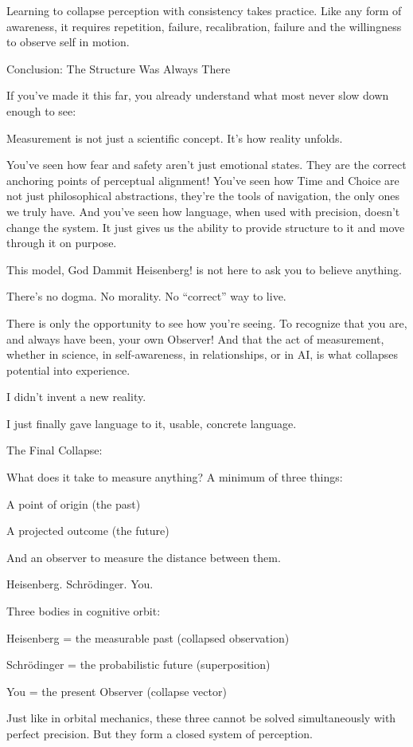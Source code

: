 \documentclass[11pt]{article}
\begin{document}
Learning to collapse perception with consistency takes practice. Like any form of awareness, it requires repetition, failure, recalibration, failure and the willingness to observe self in motion.

Conclusion: The Structure Was Always There 

If you’ve made it this far, you already understand what most never slow down enough to see:

Measurement is not just a scientific concept.
It’s how reality unfolds.

You’ve seen how fear and safety aren’t just emotional states. They are the correct anchoring points of perceptual alignment!
You’ve seen how Time and Choice are not just philosophical abstractions, they’re the tools of navigation, the only ones we truly have.
And you’ve seen how language, when used with precision, doesn’t change the system.
It just gives us the ability to provide structure to it and move through it on purpose.

This model, God Dammit Heisenberg! is not here to ask you to believe anything.

There’s no dogma.
No morality.
No “correct” way to live.

There is only the opportunity to see how you're seeing.
To recognize that you are, and always have been, your own Observer!
And that the act of measurement, whether in science, in self-awareness, in relationships, or in AI, is what collapses potential into experience.

I didn’t invent a new reality.

I just finally gave language to it, usable, concrete language.

The Final Collapse:

What does it take to measure anything? A minimum of three things:

A point of origin (the past)

A projected outcome (the future)

And an observer to measure the distance between them.

Heisenberg. Schrödinger. You.

Three bodies in cognitive orbit:

Heisenberg = the measurable past (collapsed observation)

Schrödinger = the probabilistic future (superposition)

You = the present Observer (collapse vector)

Just like in orbital mechanics, these three cannot be solved simultaneously with perfect precision. But they form a closed system of perception.
\end{document}

